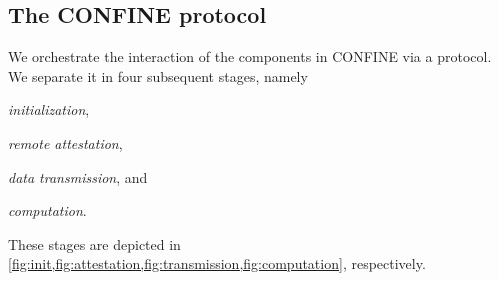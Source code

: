 \subsection{The CONFINE protocol}
We orchestrate the interaction of the components in CONFINE via a protocol. We separate it in four subsequent stages, namely
\begin{inparaenum}
	\item \textit{initialization}, \item \textit{remote attestation}, \item \textit{data transmission}, and \item \textit{computation}.
\end{inparaenum}
These stages are depicted in \cref{fig:init,fig:attestation,fig:transmission,fig:computation}, respectively.


